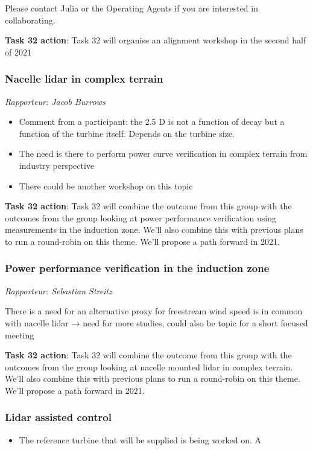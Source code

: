 Please contact Julia or the Operating Agents if you are interested in
collaborating.

\textbf{Task 32 action}: Task 32 will organise an alignment workshop in
the second half of 2021

\subsubsection{Nacelle lidar in complex terrain}
\emph{Rapporteur: Jacob Burrows}


\begin{itemize}
\item
  Comment from a participant: the 2.5 D is not a function of decay but a
  function of the turbine itself. Depends on the turbine size.
\item
  The need is there to perform power curve verification in complex
  terrain from industry perspective
\item
  There could be another workshop on this topic
\end{itemize}


\textbf{Task 32 action}: Task 32 will combine the outcome from this
group with the outcomes from the group looking at power performance
verification using measurements in the induction zone. We'll also
combine this with previous plans to run a round-robin on this theme.
We'll propose a path forward in 2021.

\subsubsection{Power performance verification in the induction zone}

\emph{Rapporteur: Sebastian Streitz}

There is a need for an alternative proxy for freestream wind speed is in
common with nacelle lidar → need for more studies, could also be topic
for a short focused meeting

\textbf{Task 32 action}: Task 32 will combine the outcome from this
group with the outcomes from the group looking at nacelle mounted lidar
in complex terrain. We'll also combine this with previous plans to run a
round-robin on this theme. We'll propose a path forward in
2021.

\subsubsection{Lidar assisted control}

\begin{itemize}

\item
  The reference turbine that will be supplied is being worked on. A
\end{itemize}


